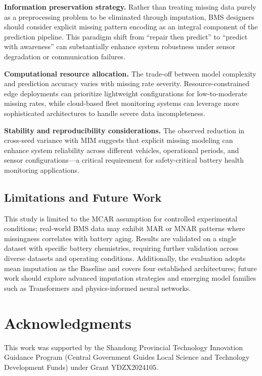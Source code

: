 \documentclass[5p,times]{elsarticle}
\begin{document}
\textbf{Information preservation strategy.} Rather than treating missing data purely as a preprocessing problem to be eliminated through imputation, BMS designers should consider explicit missing pattern encoding as an integral component of the prediction pipeline. This paradigm shift from ``repair then predict'' to ``predict with awareness'' can substantially enhance system robustness under sensor degradation or communication failures.

\textbf{Computational resource allocation.} The trade-off between model complexity and prediction accuracy varies with missing rate severity. Resource-constrained edge deployments can prioritize lightweight configurations for low-to-moderate missing rates, while cloud-based fleet monitoring systems can leverage more sophisticated architectures to handle severe data incompleteness.

\textbf{Stability and reproducibility considerations.} The observed reduction in cross-seed variance with MIM suggests that explicit missing modeling can enhance system reliability across different vehicles, operational periods, and sensor configurations—a critical requirement for safety-critical battery health monitoring applications.

\subsection{Limitations and Future Work}\label{sec:future}

This study is limited to the MCAR assumption for controlled experimental conditions; real-world BMS data may exhibit MAR or MNAR patterns where missingness correlates with battery aging. Results are validated on a single dataset with specific battery chemistries, requiring further validation across diverse datasets and operating conditions. Additionally, the evaluation adopts mean imputation as the Baseline and covers four established architectures; future work should explore advanced imputation strategies and emerging model families such as Transformers and physics-informed neural networks.

\section*{Acknowledgments}

This work was supported by the Shandong Provincial Technology Innovation Guidance Program (Central Government Guides Local Science and Technology Development Funds) under Grant YDZX2024105.




\end{document}
